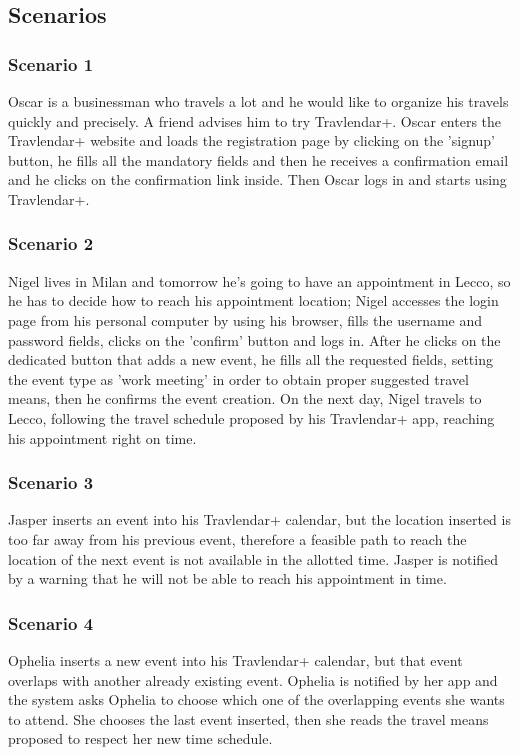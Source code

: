 \subsection{Scenarios}
\label{subsect:Scenarios}
	\subsubsection{Scenario 1}
		Oscar is a businessman who travels a lot and he would like to organize his travels quickly and precisely. A friend advises him to try Travlendar+. Oscar enters the Travlendar+ website and loads the registration page by clicking on the 'signup' button, he fills all the mandatory fields and then he receives a confirmation email and he clicks on the confirmation link inside.
Then Oscar logs in and starts using Travlendar+.
	\subsubsection{Scenario 2}
		Nigel lives in Milan and tomorrow he’s going to have an appointment in Lecco, so he has to decide how to reach his appointment location; Nigel accesses the login page from his personal computer by using his browser, fills the username and password fields, clicks on the 'confirm' button and logs in. After he clicks on the dedicated button that adds a new event, he fills all the requested fields, setting the event type as 'work meeting' in order to obtain proper suggested travel means, then he confirms the event creation. On the next day, Nigel travels to Lecco, following the travel schedule proposed by his Travlendar+ app, reaching his appointment right on time.
	\subsubsection{Scenario 3}
		Jasper inserts an event into his Travlendar+ calendar, but the location inserted is too far away from his previous event, therefore a feasible path to reach the location of the next event is not available in the allotted time. Jasper is notified by a warning that he will not be able to reach his appointment in time.	
	\subsubsection{Scenario 4}
		Ophelia inserts a new event into his Travlendar+ calendar, but that event overlaps with another already existing event. Ophelia is notified by her app and the system asks Ophelia to choose which one of the overlapping events she wants to attend. She chooses the last event inserted, then she reads the travel means proposed to respect her new time schedule.
